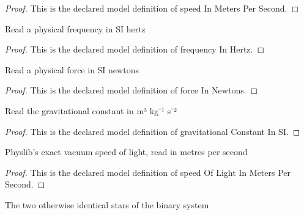 \begin{proof}
  This is the declared model definition of speed In Meters Per Second.
\end{proof}
\begin{definition}
  \label{def:physics:phyx-mini-0611:phyxminiproblems-problemphyxmini0611-frequencyinhertz}
  Read a physical frequency in SI hertz
\end{definition}
\begin{proof}
  This is the declared model definition of frequency In Hertz.
\end{proof}
\begin{definition}
  \label{def:physics:phyx-mini-0611:phyxminiproblems-problemphyxmini0611-forceinnewtons}
  Read a physical force in SI newtons
\end{definition}
\begin{proof}
  This is the declared model definition of force In Newtons.
\end{proof}
\begin{definition}
  \label{def:physics:phyx-mini-0611:phyxminiproblems-problemphyxmini0611-gravitationalconstantinsi}
  Read the gravitational constant in m³ kg⁻¹ s⁻²
\end{definition}
\begin{proof}
  This is the declared model definition of gravitational Constant In SI.
\end{proof}
\begin{definition}
  \label{def:physics:phyx-mini-0611:phyxminiproblems-problemphyxmini0611-speedoflightinmeterspersecond}
  Physlib's exact vacuum speed of light, read in metres per second
\end{definition}
\begin{proof}
  This is the declared model definition of speed Of Light In Meters Per Second.
\end{proof}
\begin{definition}
  \label{def:physics:phyx-mini-0611:phyxminiproblems-problemphyxmini0611-binarystar}
  The two otherwise identical stars of the binary system
\end{definition}
